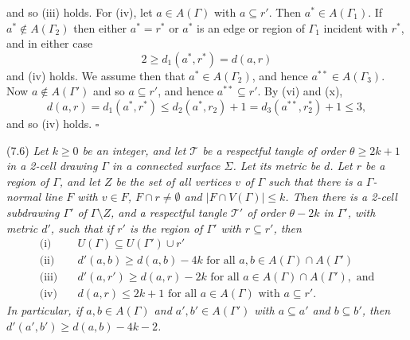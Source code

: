 \noindent and so (iii) holds. For (iv), let $a \in A(\Gamma)$ with $a \subseteq r'$. Then $a^* \in A(\Gamma_1)$. If $a^* \notin A(\Gamma_2)$ then either $a^* = r^*$ or $a^*$ is an edge or region of $\Gamma_1$ incident with $r^*$, and in either case
\begin{equation*}
2 \ge d_1(a^*, r^*) = d(a, r)
\end{equation*}
and (iv) holds. We assume then that $a^* \in A(\Gamma_2)$, and hence $a^{**} \in A(\Gamma_3)$. Now $a \notin A(\Gamma')$ and so $a \subseteq r'$, and hence $a^{**} \subseteq r'$. By (vi) and (x),
\begin{equation*}
d(a, r) = d_1(a^*, r^*) \le d_2(a^*, r_2) + 1 = d_3(a^{**}, r_2^*) + 1 \le 3,
\end{equation*}
and so (iv) holds. $\square$

\stmt
(7.6) \textit{Let $k \ge 0$ be an integer, and let $\mathscr{T}$ be a respectful tangle of order $\theta \ge 2k + 1$ in a 2-cell drawing $\Gamma$ in a connected surface $\Sigma$. Let its metric be $d$. Let $r$ be a region of $\Gamma$, and let $Z$ be the set of all vertices $v$ of $\Gamma$ such that there is a $\Gamma$-normal line $F$ with $v \in F$, $F \cap r \ne \emptyset$ and $|F \cap V(\Gamma)| \le k$. Then there is a 2-cell subdrawing $\Gamma'$ of $\Gamma \setminus Z$, and a respectful tangle $\mathscr{T}'$ of order $\theta - 2k$ in $\Gamma'$, with metric $d'$, such that if $r'$ is the region of $\Gamma'$ with $r \subseteq r'$, then}
\begin{align*}
\text{(i)} \quad & U(\Gamma) \subseteq U(\Gamma') \cup r' \\
\text{(ii)} \quad & d'(a, b) \ge d(a, b) - 4k \text{ for all } a, b \in A(\Gamma) \cap A(\Gamma') \\
\text{(iii)} \quad & d'(a, r') \ge d(a, r) - 2k \text{ for all } a \in A(\Gamma) \cap A(\Gamma'), \text{ and} \\
\text{(iv)} \quad & d(a, r) \le 2k + 1 \text{ for all } a \in A(\Gamma) \text{ with } a \subseteq r'.
\end{align*}
\textit{In particular, if $a, b \in A(\Gamma)$ and $a', b' \in A(\Gamma')$ with $a \subseteq a'$ and $b \subseteq b'$, then $d'(a', b') \ge d(a, b) - 4k - 2$.}

